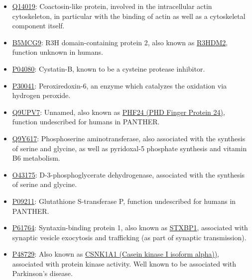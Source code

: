 \begin{itemize}
\item \href{http://www.pantherdb.org/genes/gene.do?acc=HUMAN\%7CHGNC\%3D18304\%7CUniProtKB\%3DQ14019}{Q14019}: Coactosin-like protein, involved in the intracellular actin cytoskeleton, in particular with the binding of actin as well as a cytoskeletal component itself.
\item \href{http://www.pantherdb.org/genes/gene.do?acc=HUMAN\%7CHGNC\%3D29167\%7CUniProtKB\%3DQ9Y2K5}{B5MCG9}: R3H domain-containing protein 2, also known as \href{https://www.uniprot.org/uniprot/B5MCG9}{R3HDM2}, function unknown in humans.
\item \href{http://www.pantherdb.org/genes/gene.do?acc=HUMAN\%7CHGNC\%3D2482\%7CUniProtKB\%3DP04080}{P04080}: Cystatin-B, known to be a cysteine protease inhibitor.
\item \href{http://www.pantherdb.org/genes/gene.do?acc=HUMAN\%7CHGNC\%3D16753\%7CUniProtKB\%3DP30041}{P30041}: Peroxiredoxin-6, an enzyme which catalyzes the oxidation via hydrogen peroxide.
\item \href{http://www.pantherdb.org/genes/gene.do?acc=HUMAN\%7CHGNC\%3D29180\%7CUniProtKB\%3DQ9UPV7}{Q9UPV7}: Unnamed, also known as \href{https://www.uniprot.org/uniprot/Q9UPV7}{PHF24 (PHD Finger Protein 24)}, function undescribed for humans in PANTHER.
\item \href{http://www.pantherdb.org/genes/gene.do?acc=HUMAN\%7CHGNC\%3D19129\%7CUniProtKB\%3DQ9Y617}{Q9Y617}: Phosphoserine aminotransferase, also associated with the synthesis of serine and glycine, as well as pyridoxal-5 phosphate synthesis and vitamin B6 metabolism.
\item \href{http://www.pantherdb.org/genes/gene.do?acc=HUMAN\%7CHGNC\%3D8923\%7CUniProtKB\%3DO43175}{O43175}: D-3-phosphoglycerate dehydrogenase, associated with the synthesis of serine and glycine.
\item \href{http://www.pantherdb.org/genes/gene.do?acc=HUMAN\%7CHGNC\%3D4638\%7CUniProtKB\%3DP09211}{P09211}: Glutathione S-transferase P, function undescribed for humans in PANTHER.
\item \href{http://www.pantherdb.org/genes/gene.do?acc=HUMAN\%7CHGNC\%3D11444\%7CUniProtKB\%3DP61764}{P61764}: Syntaxin-binding protein 1, also known as \href{https://www.uniprot.org/uniprot/P61764}{STXBP1}, associated with synaptic vesicle exocytosis and trafficking (as part of synaptic transmission).
\item \href{http://www.pantherdb.org/genes/gene.do?acc=HUMAN\%7CHGNC\%3D2451\%7CUniProtKB\%3DP48729}{P48729}: Also known as \href{https://www.uniprot.org/uniprot/P48729}{CSNK1A1 (Casein kinase I isoform alpha))}, associated with protein kinase activity. Well known to be associated with Parkinson's disease.

\end{itemize}
